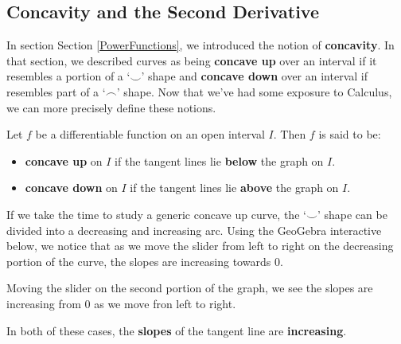 \documentclass{ximera}
\begin{document}
\subsection{Concavity and the Second Derivative}
\label{concavity}

In section Section \ref{PowerFunctions}, we introduced the notion of \textbf{concavity}.  In that section, we described curves as  being  \textbf{concave up} over an interval if it resembles a  portion of a `$\smile$' shape and   \textbf{concave down} over an interval if resembles part of a `$\frown$' shape. Now that we've had some exposure to Calculus, we can more precisely define these notions.





\begin{definition}  \label{concavitydefn} Let $f$ be a differentiable function on an open interval  $I$.  Then $f$ is said to be:

\begin{itemize}

\item  \textbf{concave up} on $I$ if the tangent lines lie \textbf{below} the graph on $I$.

\item  \textbf{concave down} on $I$ if the tangent lines lie \textbf{above} the graph on $I$.


\end{itemize}

\end{definition}



If we take the time to study a generic concave up curve, the `$\smile$' shape can be divided into a decreasing and increasing arc.  Using the GeoGebra interactive below, we notice that as we move the slider from left to right on the decreasing portion of the curve, the slopes are increasing towards $0$. 

Moving the slider on the second portion of the graph, we see the slopes are increasing from $0$ as we move fron left to right.


\begin{center}
\end{center}


In both of these cases, the \textbf{slopes} of the tangent line are \textbf{increasing}.  
\end{document}
